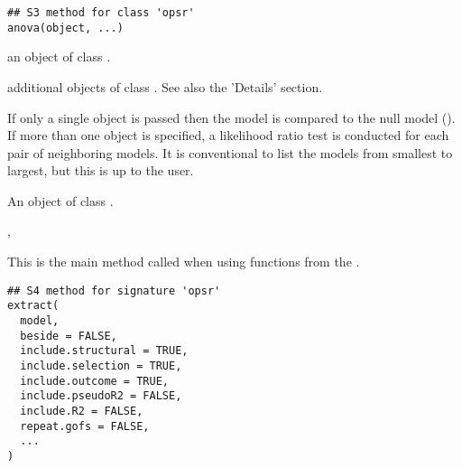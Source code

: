 \documentclass[letterpaper]{book}
\begin{document}
%
\begin{Usage}
\begin{verbatim}
## S3 method for class 'opsr'
anova(object, ...)
\end{verbatim}
\end{Usage}
%
\begin{Arguments}
\begin{ldescription}
\item[\code{object}] an object of class .

\item[\code{...}] additional objects of class . See also the 'Details' section.
\end{ldescription}
\end{Arguments}
%
\begin{Details}
If only a single object is passed then the model is compared to the null model
(). If more than one object is specified, a likelihood ratio
test is conducted for each pair of neighboring models. It is conventional to
list the models from smallest to largest, but this is up to the user.
\end{Details}
%
\begin{Value}
An object of class .
\end{Value}
%
\begin{SeeAlso}
, 
\end{SeeAlso}
%
\begin{Examples}
\end{Examples}
%
\begin{Description}
This is the main method called when using functions from the .
\end{Description}
%
\begin{Usage}
\begin{verbatim}
## S4 method for signature 'opsr'
extract(
  model,
  beside = FALSE,
  include.structural = TRUE,
  include.selection = TRUE,
  include.outcome = TRUE,
  include.pseudoR2 = FALSE,
  include.R2 = FALSE,
  repeat.gofs = FALSE,
  ...
)
\end{verbatim}
\end{Usage}
\end{document}
